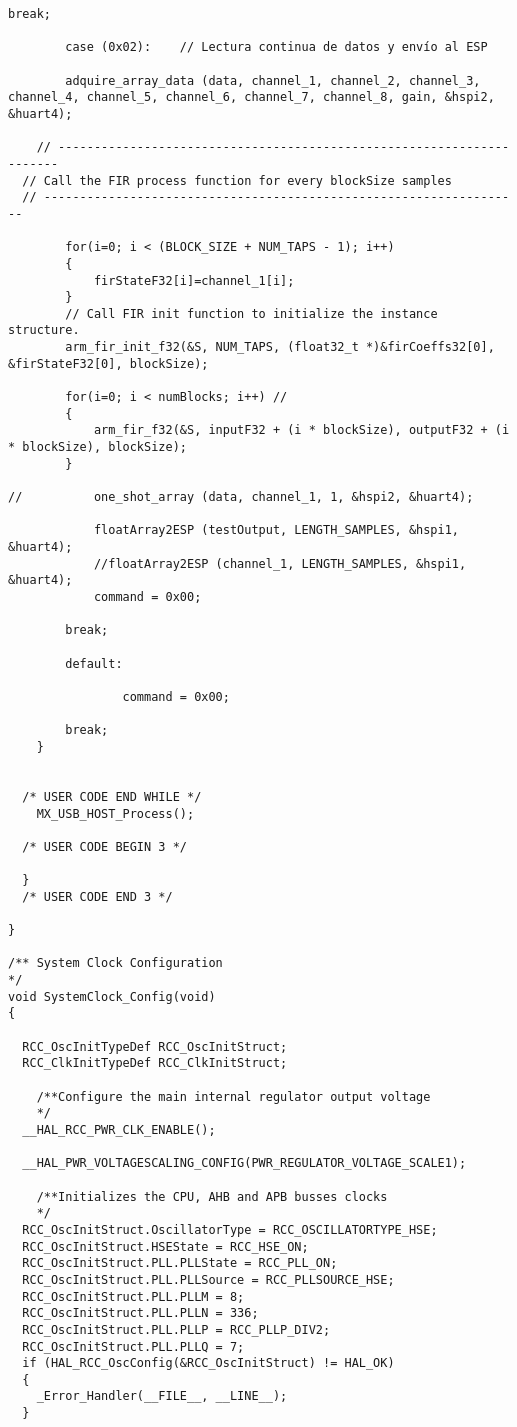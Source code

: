 \begin{lstlisting}[label=algoritmo:STM32F4:main.c,style = STM-code,frame=single,caption=STM32F4:main.c]
		break;
		
		case (0x02):	// Lectura continua de datos y envío al ESP
			
		adquire_array_data (data, channel_1, channel_2, channel_3, channel_4, channel_5, channel_6, channel_7, channel_8, gain, &hspi2, &huart4);

	// ----------------------------------------------------------------------
  // Call the FIR process function for every blockSize samples
  // ------------------------------------------------------------------- 
  
		for(i=0; i < (BLOCK_SIZE + NUM_TAPS - 1); i++) 
		{
			firStateF32[i]=channel_1[i];
		}
		// Call FIR init function to initialize the instance structure. 
		arm_fir_init_f32(&S, NUM_TAPS, (float32_t *)&firCoeffs32[0], &firStateF32[0], blockSize);
		
		for(i=0; i < numBlocks; i++) //
		{
			arm_fir_f32(&S, inputF32 + (i * blockSize), outputF32 + (i * blockSize), blockSize);
		}
		
//			one_shot_array (data, channel_1, 1, &hspi2, &huart4);
			
			floatArray2ESP (testOutput, LENGTH_SAMPLES, &hspi1, &huart4);
			//floatArray2ESP (channel_1, LENGTH_SAMPLES, &hspi1, &huart4);
			command = 0x00;
				
		break;
			
		default:
			
				command = 0x00;
		
		break;
	}
	
		
  /* USER CODE END WHILE */
    MX_USB_HOST_Process();

  /* USER CODE BEGIN 3 */

  }
  /* USER CODE END 3 */

}

/** System Clock Configuration
*/
void SystemClock_Config(void)
{

  RCC_OscInitTypeDef RCC_OscInitStruct;
  RCC_ClkInitTypeDef RCC_ClkInitStruct;

    /**Configure the main internal regulator output voltage 
    */
  __HAL_RCC_PWR_CLK_ENABLE();

  __HAL_PWR_VOLTAGESCALING_CONFIG(PWR_REGULATOR_VOLTAGE_SCALE1);

    /**Initializes the CPU, AHB and APB busses clocks 
    */
  RCC_OscInitStruct.OscillatorType = RCC_OSCILLATORTYPE_HSE;
  RCC_OscInitStruct.HSEState = RCC_HSE_ON;
  RCC_OscInitStruct.PLL.PLLState = RCC_PLL_ON;
  RCC_OscInitStruct.PLL.PLLSource = RCC_PLLSOURCE_HSE;
  RCC_OscInitStruct.PLL.PLLM = 8;
  RCC_OscInitStruct.PLL.PLLN = 336;
  RCC_OscInitStruct.PLL.PLLP = RCC_PLLP_DIV2;
  RCC_OscInitStruct.PLL.PLLQ = 7;
  if (HAL_RCC_OscConfig(&RCC_OscInitStruct) != HAL_OK)
  {
    _Error_Handler(__FILE__, __LINE__);
  }


\end{lstlisting}

